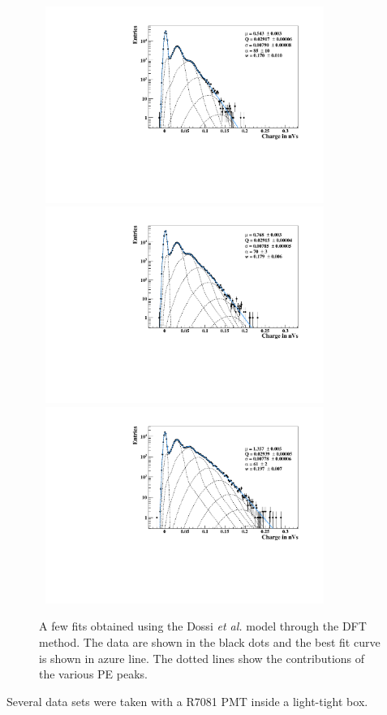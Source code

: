 \documentclass[a4paper,11pt]{article}
\begin{document}
\begin{figure}[!t]
\centering
\includegraphics[width=9.5cm, height=6.4cm]{figures/c1.pdf} \\[1.5ex]
\includegraphics[width=9.5cm, height=6.4cm]{figures/c2.pdf}  \\[1.5ex] %
\includegraphics[width=9.5cm, height=6.4cm]{figures/c3.pdf} %
\caption{A few fits obtained using the Dossi \emph{et al.} model through the DFT method. 
The data are shown in the black dots and the best fit curve is shown in azure line. 
The dotted lines show the contributions of the various PE peaks.}
\label{fig:Q}
\end{figure}
Several data sets were taken with a R7081 PMT inside a light-tight box. 
\end{document}
